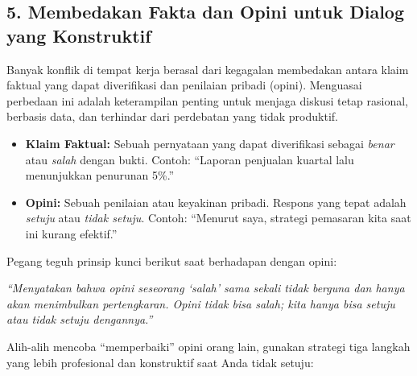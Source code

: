 \documentclass[
  letterpaper,
  DIV=11,
  numbers=noendperiod]{scrreprt}
\begin{document}
\subsection{5. Membedakan Fakta dan Opini untuk Dialog yang
Konstruktif}\label{membedakan-fakta-dan-opini-untuk-dialog-yang-konstruktif}

Banyak konflik di tempat kerja berasal dari kegagalan membedakan antara
klaim faktual yang dapat diverifikasi dan penilaian pribadi (opini).
Menguasai perbedaan ini adalah keterampilan penting untuk menjaga
diskusi tetap rasional, berbasis data, dan terhindar dari perdebatan
yang tidak produktif.

\begin{itemize}
\item
  \textbf{Klaim Faktual:} Sebuah pernyataan yang dapat diverifikasi
  sebagai \emph{benar} atau \emph{salah} dengan bukti. Contoh: ``Laporan
  penjualan kuartal lalu menunjukkan penurunan 5\%.''
\item
  \textbf{Opini:} Sebuah penilaian atau keyakinan pribadi. Respons yang
  tepat adalah \emph{setuju} atau \emph{tidak setuju}. Contoh: ``Menurut
  saya, strategi pemasaran kita saat ini kurang efektif.''
\end{itemize}

Pegang teguh prinsip kunci berikut saat berhadapan dengan opini:

\emph{``Menyatakan bahwa opini seseorang `salah' sama sekali tidak
berguna dan hanya akan menimbulkan pertengkaran. Opini tidak bisa salah;
kita hanya bisa setuju atau tidak setuju dengannya.''}

Alih-alih mencoba ``memperbaiki'' opini orang lain, gunakan strategi
tiga langkah yang lebih profesional dan konstruktif saat Anda tidak
setuju:
\end{document}
